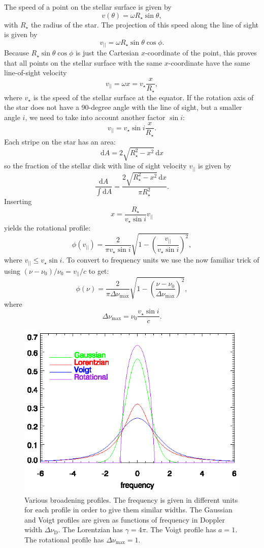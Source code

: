 \documentclass[12pt]{article}
\numberwithin{equation}{section}
\def\dd{\mathrm{d}}
\def\dnud{\ensuremath{\Delta \nu_\mathrm{D}}}
\newcommand{\be}{\begin{equation}}
\newcommand{\ee}{\end{equation}}
\begin{document}
The speed of a point on the stellar surface is given by
\be
v(\theta) = \omega R_\star \sin{\theta},
\ee
with $R_\star$ the radius of the star. The projection of this speed along the line of sight is given by
\be
v_{||} = \omega R_\star \sin{\theta} \cos{\phi}.
\ee
Because $R_\star \sin{\theta} \cos{\phi}$ is just the Cartesian $x$-coordinate of the point, this proves that all points on the stellar surface with the same $x$-coordinate have the same line-of-sight velocity 
\be
v_{||} = \omega x = v_\star \frac{x}{R_\star},
\ee
where $v_\star$ is the speed of the stellar surface at the equator. If the rotation axis of the star does not have a 90-degree angle with the line of sight, but a smaller angle $i$, we need to take into account another factor $\sin{i}$:
\be
v_{||} = v_\star \sin{i} \frac{x}{R_\star}.
\ee
Each stripe on the star has an area:
\be
\dd A = 2 \sqrt{R_\star^2- x^2} \, \dd x
\ee
so the fraction of the stellar disk with line of sight velocity $v_{||}$ is given by
\be
\dfrac{\dd A}{\int \dd A} = \dfrac{2 \sqrt{R_\star^2- x^2} \, \dd x}{\pi R_\star^2}.
\ee
Inserting
\be
x = \frac{R_\star}{v_\star \sin{i} } v_{||} 
\ee
yields the rotational profile:
\be
\phi(v_{||}) = \frac{2}{\pi v_\star \sin{i}} \sqrt{1 - \left( \frac{v_{||}}{v_\star \sin{i}} \right)^2 },
\ee
where $v_{||} \le v_\star \sin{i}$. To convert to frequency units we use the now familiar 
trick of using $(\nu-\nu_0) / \nu_0 = v_{||}/c$ to get:
\be
\phi(\nu) = \frac{2}{\pi \Delta \nu_\mathrm{max}} \sqrt{1 - \left( \frac{\nu-\nu_0}{\Delta \nu_\mathrm{max}} \right)^2 },
\ee
where
\be
\Delta \nu_\mathrm{max} = \nu_0 \frac{v_\star \sin{i} }{c}.
\ee

   \begin{figure}
   \centering
   \includegraphics[width=12cm]{figs/profiles}
    \caption{Various broadening profiles. The frequency is given in different units for each profile in order to give them similar widths. The Gaussian and Voigt profiles are given as functions of frequency in Doppler width $\dnud$. The Lorentzian has $\gamma = 4 \pi$. The Voigt profile has $a=1$. The rotational profile has  $\Delta \nu_\mathrm{max} =1$.
    \label{fig:profiles}}
    \end{figure}
\end{document}
